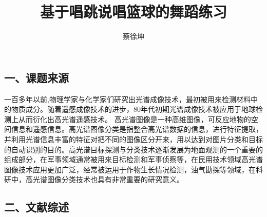\documentclass[UTF8,zihao=-4]{oucart}
\title{基于唱跳说唱篮球的舞蹈练习}
\author{蔡徐坤}
\begin{document}
\makecoveror

\newpage

\setcounter{page}{1}

\subsection*{一、课题来源}

\begin{framed}

一百多年以前,物理学家与化学家们研究出光谱成像技术，最初被用来检测材料中的物质成分。随着遥感成像技术的进步，80年代初期光谱成像技术被应用于地球检测上从而衍化出高光谱遥感技术\cite{ref9}。 高光谱图像是一种高维图像，可反应地物的空间信息和遥感信息。高光谱图像分类是指整合高光谱数据的信息，进行特征提取，并利用光谱信息丰富的特征对把不同的图像区分开来，用以达到对图片分类和目标的自动识别的目的。高光谱目标探测与分类技术逐渐发展为地面观测的一个重要的组成部分，在军事领域通常被用来目标检测和军事侦察等，在民用技术领域高光谱图像技术应用更加广泛，经常被运用于作物生长情况检测，油气勘探等领域，在科研中，高光谱图像分类技术也具有非常重要的研究意义。

\end{framed}

\subsection*{二、文献综述}
\end{document}
